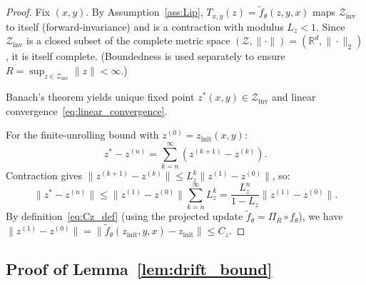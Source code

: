 \documentclass{article}
\theoremstyle{plain}
\theoremstyle{definition}
\theoremstyle{remark}
\newcommand{\R}{\mathbb{R}}
\newcommand{\ZZ}{\mathcal{Z}}
\begin{document}
\begin{proof}
Fix $(x,y)$.
By Assumption~\ref{ass:Lip}, $T_{x,y}(z)=\tilde f_\theta(z,y,x)$ maps $\mathcal{Z}_{\mathrm{inv}}$ to itself (forward-invariance) and is a contraction with modulus $L_z<1$.
Since $\mathcal{Z}_{\mathrm{inv}}$ is a closed subset of the complete metric space $(\ZZ,\|\cdot\|)=(\R^d,\|\cdot\|_2)$, it is itself complete.
(Boundedness is used separately to ensure $R=\sup_{z\in\mathcal{Z}_{\mathrm{inv}}}\|z\|<\infty$.)

Banach's theorem yields unique fixed point $z^*(x,y) \in \mathcal{Z}_{\mathrm{inv}}$ and linear convergence~\eqref{eq:linear_convergence}.

For the finite-unrolling bound with $z^{(0)} = z_{\mathrm{init}}(x,y)$:
\[
z^* - z^{(n)} = \sum_{k=n}^{\infty}(z^{(k+1)} - z^{(k)}).
\]
Contraction gives $\|z^{(k+1)} - z^{(k)}\| \le L_z^k \|z^{(1)}-z^{(0)}\|$, so:
\[
\|z^* - z^{(n)}\| \le \|z^{(1)}-z^{(0)}\| \sum_{k=n}^{\infty} L_z^k = \frac{L_z^n}{1-L_z}\|z^{(1)}-z^{(0)}\|.
\]
By definition~\eqref{eq:Cz_def} (using the projected update $\tilde f_\theta=\Pi_R\circ f_\theta$), we have
$\|z^{(1)}-z^{(0)}\| = \|\tilde f_\theta(z_{\mathrm{init}},y,x) - z_{\mathrm{init}}\| \le C_z$.
\end{proof}

\subsection{Proof of Lemma~\ref{lem:drift_bound}}
\end{document}
